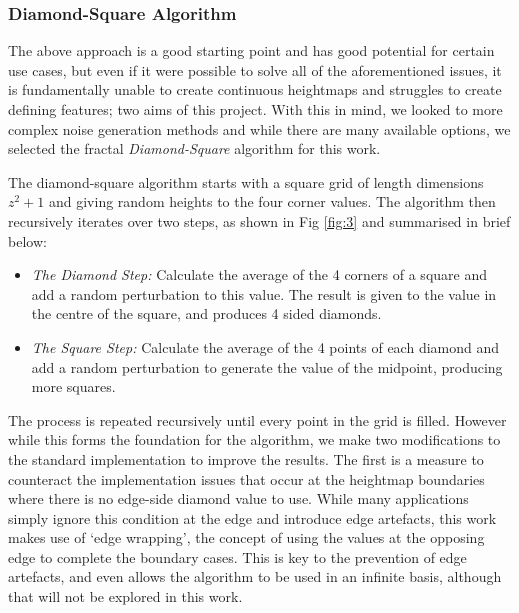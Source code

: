 \documentclass[12pt,a4paper]{article}
\begin{document}
\subsubsection{Diamond-Square Algorithm}

The above approach is a good starting point and has good potential for certain use cases, but even if it were possible to solve all of the aforementioned issues, it is fundamentally unable to create continuous heightmaps and struggles to create defining features; two aims of this project. With this in mind, we looked to more complex noise generation methods and while there are many available options, we selected the fractal \emph{Diamond-Square} algorithm for this work. 

The diamond-square algorithm starts with a square grid of length dimensions $z^2 + 1$ and giving random heights to the four corner values. The algorithm then recursively iterates over two steps, as shown in Fig \ref{fig:3} and summarised in brief below:

\begin{itemize}
	\item[]\emph{The Diamond Step:} Calculate the average of the 4 corners of a square and add a random perturbation to this value. The result is given to the value in the centre of the square, and produces 4 sided diamonds.
	\item[]\emph{The Square Step:} Calculate the average of the 4 points of each diamond and add a random perturbation to generate the value of the midpoint, producing more squares.
\end{itemize} 

The process is repeated recursively until every point in the grid is filled. However while this forms the foundation for the algorithm, we make two modifications to the standard implementation to improve the results. The first is a measure to counteract the implementation issues that occur at the heightmap boundaries where there is no edge-side diamond value to use. While many applications simply ignore this condition at the edge and introduce edge artefacts, this work makes use of `edge wrapping', the concept of using the values at the opposing edge to complete the boundary cases. This is key to the prevention of edge artefacts, and even allows the algorithm to be used in an infinite basis, although that will not be explored in this work. 
\end{document}
